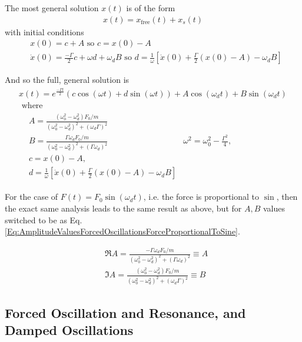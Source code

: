 \documentclass[10pt]{amsart}
\begin{document}
\begin{multicols*}{2}
The most general solution $x(t)$ is of the form
\[
\begin{gathered}
	x(t) = x_{\text{free}}(t) + x_s(t)
\end{gathered}
\]
with initial conditions
\[
\begin{aligned}
	& x(0) = c + A \text{ so } c = x(0) - A \\
	& \dot{x}(0) = \frac{-\Gamma}{2} c + \omega d + \omega_d B \text{ so } d = \frac{1}{\omega} \left[ \dot{x}(0) + \frac{\Gamma}{2} (x(0) - A) - \omega_d B \right]
\end{aligned}
\]

And so the full, general solution is 
\begin{equation}
	\begin{gathered}
		x(t) = e^{\frac{-\Gamma t}{2} } (c\cos{(\omega t)} + d \sin{ (\omega t)} ) + A \cos{ (\omega_d t)} + B \sin{(\omega_d t)} \\
		\text{ where } \\
		\begin{aligned}
			& A = \frac{ (\omega_0^2 - \omega_d^2) F_0 / m }{ (\omega_0^2 - \omega_d^2)^2 + (\omega_d \Gamma)^2 } \\
			& B = \frac{ \Gamma \omega_d F_0 / m }{ (\omega_0^2 - \omega_d^2)^2 + (\Gamma \omega_d)^2 }
			& \omega^2 = \omega_0^2 - \frac{\Gamma^2}{4}, \\
			& c = x(0) - A, \\
			& d = \frac{1}{\omega} \left[ \dot{x}(0) + \frac{\Gamma}{2} (x(0) - A) - \omega_d B \right]
		\end{aligned}
	\end{gathered}
\end{equation}

For the case of $F(t) = F_0 \sin{(\omega_d t)}$, i.e. the force is proportional to $\sin$, then the exact same analysis leads to the same result as above, but for $A,B$ values switched to be as Eq. \ref{Eq:AmplitudeValuesForcedOscillationsForceProportionalToSine}.

\[
\begin{aligned}
	& \Re{A} = \frac{ -\Gamma \omega_d F_0 /m }{ (\omega_0^2 - \omega_d^2)^2 + (\Gamma \omega_d )^2 } \equiv A \\
	& \Im{A} = \frac{ (\omega_0^2 - \omega_d^2) F_0/m }{(\omega_0^2 - \omega_d^2)^2 + (\omega_d \Gamma)^2} \equiv B 
\end{aligned}
\]

\subsection{Forced Oscillation and Resonance, and Damped Oscillations}


\end{multicols*}
\end{document}
